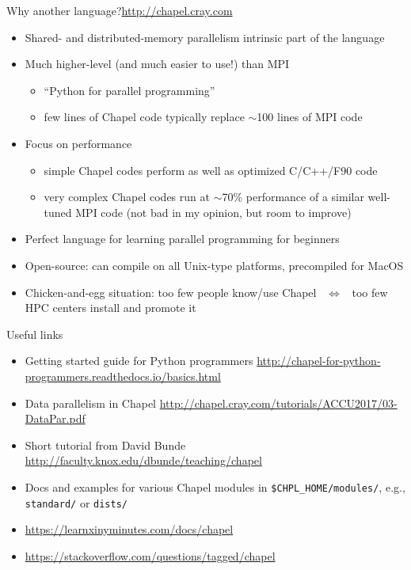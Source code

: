 \documentclass[xcolor=svgnames,aspectratio=169]{beamer}
\begin{document}

\begin{frame}{Why another language?}{\url{http://chapel.cray.com}}
  \begin{itemize}\setlength{\itemsep}{1mm}
    \item Shared- and distributed-memory parallelism intrinsic part of the language
    \item Much higher-level (and much easier to use!) than MPI
    \medskip
    \begin{itemize}\setlength{\itemsep}{1mm}
      \item ``Python for parallel programming''
      \item few lines of Chapel code typically replace $\sim$100 lines of MPI code
    \end{itemize}    
    \item Focus on performance
    \medskip
    \begin{itemize}\setlength{\itemsep}{1mm}
      \item simple Chapel codes perform as well as optimized C/C++/F90 code
      \item very complex Chapel codes run at $\sim$70\% performance of a similar well-tuned MPI code (not
      bad in my opinion, but room to improve)
    \end{itemize}    
    \item Perfect language for learning parallel programming for beginners
    \item Open-source: can compile on all Unix-type platforms, precompiled for MacOS
    \item Chicken-and-egg situation: too few people know/use Chapel ~$\Longleftrightarrow$~ too few HPC
    centers install and promote it
  \end{itemize}
\end{frame}

\begin{frame}{Useful links}
  \begin{itemize}\setlength{\itemsep}{3mm}
    \item Getting started guide for Python programmers
    {\small\url{http://chapel-for-python-programmers.readthedocs.io/basics.html}}
    \item Data parallelism in Chapel \url{http://chapel.cray.com/tutorials/ACCU2017/03-DataPar.pdf}
    \item Short tutorial from David Bunde \url{http://faculty.knox.edu/dbunde/teaching/chapel}
    \item Docs and examples for various Chapel modules in \texttt{\$CHPL\_HOME/modules/}, e.g.,
    \texttt{standard/} or \texttt{dists/}
    \item \url{https://learnxinyminutes.com/docs/chapel}
    \item \url{https://stackoverflow.com/questions/tagged/chapel}
  \end{itemize}
\end{frame}
\end{document}
